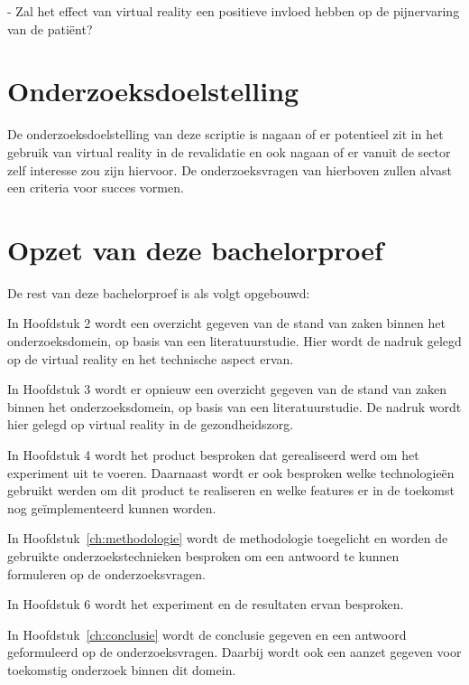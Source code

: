 - Zal het effect van virtual reality een positieve invloed hebben op de pijnervaring van de patiënt?


\section{Onderzoeksdoelstelling}
\label{sec:onderzoeksdoelstelling}
De onderzoeksdoelstelling van deze scriptie is nagaan of er potentieel zit in het gebruik van virtual reality in de revalidatie en ook nagaan of er vanuit de sector zelf interesse zou zijn hiervoor. De onderzoeksvragen van hierboven zullen alvast een criteria voor succes vormen.


\section{Opzet van deze bachelorproef}
\label{sec:opzet-bachelorproef}


De rest van deze bachelorproef is als volgt opgebouwd:

In Hoofdstuk 2 wordt een overzicht gegeven van de stand van zaken binnen het onderzoeksdomein, op basis van een literatuurstudie. Hier wordt de nadruk gelegd op de virtual reality en het technische aspect ervan.

In Hoofdstuk 3 wordt er opnieuw een overzicht gegeven van de stand van zaken binnen het onderzoeksdomein, op basis van een literatuurstudie. De nadruk wordt hier gelegd op virtual reality in de gezondheidszorg.

In Hoofdstuk 4 wordt het product besproken dat gerealiseerd werd om het experiment uit te voeren. Daarnaast wordt er ook besproken welke technologieën gebruikt werden om dit product te realiseren en welke features er in de toekomst nog geïmplementeerd kunnen worden.

In Hoofdstuk~\ref{ch:methodologie} wordt de methodologie toegelicht en worden de gebruikte onderzoekstechnieken besproken om een antwoord te kunnen formuleren op de onderzoeksvragen.

In Hoofdstuk 6 wordt het experiment en de resultaten ervan besproken.

In Hoofdstuk~\ref{ch:conclusie} wordt de conclusie gegeven en een antwoord geformuleerd op de onderzoeksvragen. Daarbij wordt ook een aanzet gegeven voor toekomstig onderzoek binnen dit domein.


